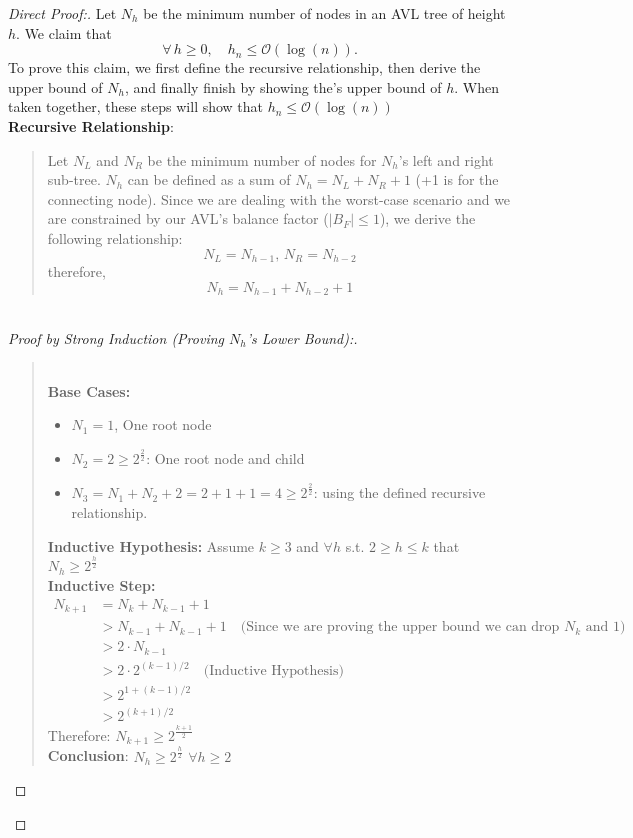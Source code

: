 \documentclass{article}
\begin{document}
\begin{proof}[Direct Proof:]
Let $N_h$ be the minimum number of nodes in an AVL tree of height $h$. We claim that
\[
\forall\, h \ge 0,\quad h_n \le \mathcal{O}(\log(n)).
\]
To prove this claim, we first define the recursive relationship, then derive the upper bound of $N_h$, and finally finish by showing the's upper bound of $h$. When taken together, these steps will show that $ h_n \le \mathcal{O}(\log(n))$\\

\textbf{Recursive Relationship}:
\begin{quote}
 Let $N_L$ and $N_R$ be the minimum number of nodes for $N_h$'s left and right sub-tree. $N_h$ can be defined as a sum of $N_h = N_{L} + N_{R} +1$ (+1 is for the connecting node). Since we are dealing with the worst-case scenario and  we are constrained by our AVL's balance factor ($|B_F| \leq 1$), we derive the following relationship:
 \[
 N_L = N_{h-1} \text{, }
 N_R = N_{h-2}
 \]
 therefore,
 \[
  N_h = N_{h-1} + N_{h-2} + 1
 \] 
\end{quote}
\begin{proof}[\\Proof by Strong Induction (Proving $N_h$'s Lower Bound):]
\begin{quote}

\textbf{\\Base Cases:}
\begin{itemize}
    \item $N_1 = 1$, One root node
    \item $N_2 = 2 \ge 2^{\frac{2}{2}} $: One root node and child
    \item $N_3 = N_1 + N_2 + 2 = 2+1+1=4 \ge 2^{\frac{2}{2}} $: using the defined recursive relationship.
\end{itemize}

\textbf{Inductive Hypothesis:} Assume $k \ge 3$ and $\forall h$ s.t. $2 \ge h \le k$ that $N_h \ge 2^{\frac{h}{2}}$\\



\textbf{Inductive Step:}
\begin{align*}
N_{k+1} &= N_k + N_{k-1} + 1\\
        &> N_{k-1} + N_{k-1} + 1
        \quad\text{(Since we are proving the upper bound we can drop $N_k$ and $1$)}\\
        &> 2 \cdot N_{k-1}\\
        &> 2 \cdot 2^{(k-1)/2}
        \quad\text{(Inductive Hypothesis)}\\
        &> 2^{1 + (k-1)/2}\\
        &> 2^{(k+1)/2}
\end{align*}
Therefore: $N_{k+1} \ge 2^{\frac{k+1}{2}}$\\
\textbf{Conclusion}: $N_h \ge 2^{\frac{h}{2}}$ $\forall h\ge 2$
\end{quote}
\end{proof}



\end{proof}
\end{document}
